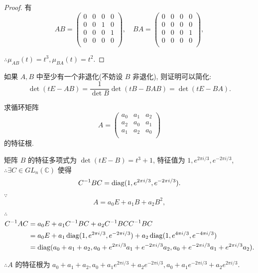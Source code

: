\documentclass[color=black,device=normal,lang=cn,mode=geye]{elegantnote}
\begin{document}
\begin{proof}
    有
    \[AB=\begin{pmatrix}
        0 & 0 & 0 & 0 \\
        0 & 0 & 1 & 0 \\
        0 & 0 & 0 & 1 \\
        0 & 0 & 0 & 0 \\
    \end{pmatrix},\quad BA=\begin{pmatrix}
        0 & 0 & 0 & 0 \\
        0 & 0 & 0 & 0 \\
        0 & 0 & 0 & 1 \\
        0 & 0 & 0 & 0 \\
    \end{pmatrix},\]

    $\therefore\mu_{AB}(t)=t^3,\mu_{BA}(t)=t^2$.
\end{proof}
\begin{note}
    如果 $A,B$ 中至少有一个非退化(不妨设 $B$ 非退化), 则证明可以简化:
    \[\det(tE-AB)=\dfrac{1}{\det B}\det(tB-BAB)=\det(tE-BA).\]
\end{note}
\begin{exercise}\label{ex3.7}
    求循环矩阵
    \[A=\begin{pmatrix}
        a_0 & a_1 & a_2 \\
        a_2 & a_0 & a_1 \\
        a_1 & a_2 & a_0 \\
    \end{pmatrix}\]
    的特征根.
\end{exercise}
\begin{solution}
    矩阵 $B$ 的特征多项式为 $\det(tE-B)=t^3+1$, 特征值为 $1,e^{2\pi i/3},e^{-2\pi i/3}$, $\therefore\exists C\in GL_n(\mathbb{C})$ 使得
    \[C^{-1}BC=\operatorname{diag}(1,e^{2\pi i/3},e^{-2\pi i/3}).\]

    $\because$
    \[A=a_0E+a_1B+a_2B^2,\]

    $\therefore$
    \begin{align*}
        C^{-1}AC & =a_0E+a_1C^{-1}BC+a_2C^{-1}BCC^{-1}BC \\
        & =a_0E+a_1\operatorname{diag}(1,e^{2\pi i/3},e^{-2\pi i/3})+a_2\operatorname{diag}(1,e^{4\pi i/3},e^{-4\pi i/3}) \\
        & =\operatorname{diag}(a_0+a_1+a_2,a_0+e^{2\pi i/3}a_1+e^{-2\pi i/3}a_2,a_0+e^{-2\pi i/3}a_1+e^{2\pi i/3}a_2).
    \end{align*}

    $\therefore A$ 的特征根为 $a_0+a_1+a_2,a_0+a_1e^{2\pi i/3}+a_2e^{-2\pi i/3},a_0+a_1e^{-2\pi i/3}+a_2e^{2\pi i/3}$.
\end{solution}
\end{document}
